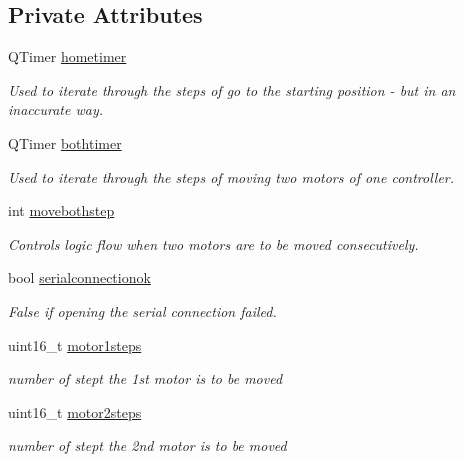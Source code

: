 \subsection*{Private Attributes}
\begin{DoxyCompactItemize}
\item 
Q\+Timer \hyperlink{classMotor_adbb59f89d592f1569ba8ad05c5c58a73}{hometimer}
\begin{DoxyCompactList}\small\item\em Used to iterate through the steps of \textquotesingle{}go to the starting position\textquotesingle{} -\/ but in an inaccurate way. \end{DoxyCompactList}\item 
\mbox{\label{classMotor_a97bf769ce21887450f412554520f4f20}} 
Q\+Timer \hyperlink{classMotor_a97bf769ce21887450f412554520f4f20}{bothtimer}
\begin{DoxyCompactList}\small\item\em Used to iterate through the steps of moving two motors of one controller. \end{DoxyCompactList}\item 
\mbox{\label{classMotor_a64cf23f01da50ffdfd3c5ba26ad44f1f}} 
int \hyperlink{classMotor_a64cf23f01da50ffdfd3c5ba26ad44f1f}{movebothstep}
\begin{DoxyCompactList}\small\item\em Controls logic flow when two motors are to be moved consecutively. \end{DoxyCompactList}\item 
\mbox{\label{classMotor_a65cf2259e3d3e61ea7e268b99f8089a0}} 
bool \hyperlink{classMotor_a65cf2259e3d3e61ea7e268b99f8089a0}{serialconnectionok}
\begin{DoxyCompactList}\small\item\em False if opening the serial connection failed. \end{DoxyCompactList}\item 
\mbox{\label{classMotor_a09aaad8e6e0ea959ac4712677443d8f0}} 
uint16\+\_\+t \hyperlink{classMotor_a09aaad8e6e0ea959ac4712677443d8f0}{motor1steps}
\begin{DoxyCompactList}\small\item\em number of stept the 1st motor is to be moved \end{DoxyCompactList}\item 
\mbox{\label{classMotor_af12031af563931e69915308aa0cce190}} 
uint16\+\_\+t \hyperlink{classMotor_af12031af563931e69915308aa0cce190}{motor2steps}
\begin{DoxyCompactList}\small\item\em number of stept the 2nd motor is to be moved \end{DoxyCompactList}\end{DoxyCompactItemize}



